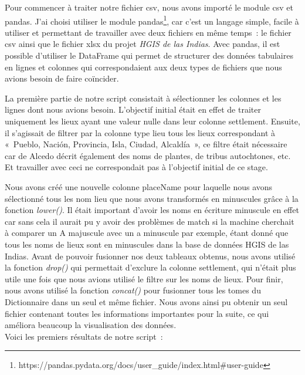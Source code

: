 \documentclass[a4paper,12pt,twoside]{book}
\begin{document}
Pour commencer à traiter notre fichier csv, nous avons importé le module csv et pandas. J’ai choisi utiliser le module pandas\footnote{https://pandas.pydata.org/docs/user\_guide/index.html\#user-guide}, car c’est un langage simple, facile à utiliser et permettant de travailler avec deux fichiers en même temps : le fichier csv ainsi que le fichier xlsx du projet \textit{HGIS de las Indias}. Avec pandas, il est possible d’utiliser le DataFrame qui permet de structurer des données tabulaires en lignes et colonnes qui correspondaient aux deux types de fichiers que nous avions besoin de faire coïncider.

La première partie de notre script consistait à sélectionner les colonnes et les lignes dont nous avions besoin. L’objectif initial était en effet de traiter uniquement les lieux ayant une valeur nulle dans leur colonne settlement. Ensuite, il s’agissait de filtrer par la colonne type lieu tous les lieux correspondant à  « Pueblo, Nación,  Provincia, Isla, Ciudad,  Alcaldía », ce filtre était nécessaire car de Alcedo décrit également des noms de plantes, de tribus autochtones, etc. Et travailler avec ceci ne correspondait pas à l’objectif initial de ce stage. 

Nous avons créé une nouvelle colonne placeName pour laquelle nous avons sélectionné tous les nom lieu que nous avons transformés en minuscules grâce à la fonction \textit{lower()}. Il était important d’avoir les noms en écriture minuscule en effet car sans cela il aurait pu y avoir des problèmes de match si la machine cherchait à comparer un A majuscule avec un a minuscule par exemple, étant donné que tous les noms de lieux sont en minuscules dans la base de données HGIS de las Indias. Avant de pouvoir fusionner nos deux tableaux obtenus, nous avons utilisé la fonction \textit{drop()} qui permettait d’exclure la colonne settlement, qui n’était plus utile une fois que nous avions utilisé le filtre sur les noms de lieux. Pour finir, nous avons utilisé la fonction \textit{concat()} pour fusionner tous les tomes du Dictionnaire dans un seul et même fichier. Nous avons ainsi pu obtenir un seul fichier contenant toutes les informations importantes pour la suite, ce qui améliora beaucoup la visualisation des données. \\

Voici les premiers résultats de notre script :\\
\end{document}
